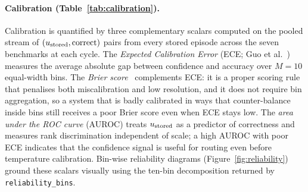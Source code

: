 \paragraph{Calibration (Table~\ref{tab:calibration}).}
Calibration is quantified by three complementary scalars computed on the pooled stream of $(u_{\text{stored}}, \mathrm{correct})$ pairs from every stored episode across the seven benchmarks at each cycle. The \emph{Expected Calibration Error} (ECE; Guo et al.~\cite{pmlr-v70-guo17a}) measures the average absolute gap between confidence and accuracy over $M = 10$ equal-width bins. The \emph{Brier score}~\cite{brier1950verification} complements ECE: it is a proper scoring rule that penalises both miscalibration and low resolution, and it does not require bin aggregation, so a system that is badly calibrated in ways that counter-balance inside bins still receives a poor Brier score even when ECE stays low. The \emph{area under the ROC curve} (AUROC) treats $u_{\text{stored}}$ as a predictor of correctness and measures rank discrimination independent of scale; a high AUROC with poor ECE indicates that the confidence signal is useful for routing even before temperature calibration. Bin-wise reliability diagrams (Figure~\ref{fig:reliability}) ground these scalars visually using the ten-bin decomposition returned by \texttt{reliability\_bins}.

